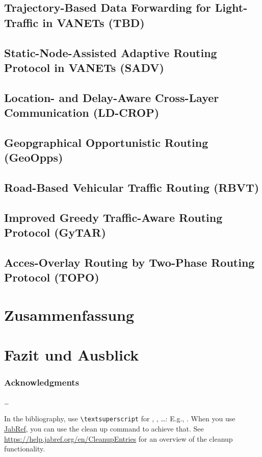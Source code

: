 \documentclass[english,runningheads,a4paper]{llncs}[2018/03/10]
\begin{document}
\subsection{Trajectory-Based Data Forwarding for Light-Traffic in VANETs (TBD)}
\subsection{Static-Node-Assisted Adaptive Routing Protocol in VANETs (SADV)}
\subsection{Location- and Delay-Aware Cross-Layer Communication (LD-CROP)}
\subsection{Geopgraphical Opportunistic Routing (GeoOpps)}
\subsection{Road-Based Vehicular Traffic Routing (RBVT)}
\subsection{Improved Greedy Traffic-Aware Routing Protocol (GyTAR)}
\subsection{Acces-Overlay Routing by Two-Phase Routing Protocol (TOPO)}

\section{Zusammenfassung}
\label{sec:summary}

\section{Fazit und Ausblick}
\label{sec:conclusion}

\subsubsection*{Acknowledgments}
\ldots

In the bibliography, use \texttt{\textbackslash textsuperscript} for , , \ldots:
E.g., .
When you use \href{https://www.jabref.org}{JabRef}, you can use the clean up command to achieve that.
See \url{https://help.jabref.org/en/CleanupEntries} for an overview of the cleanup functionality.
\end{document}
